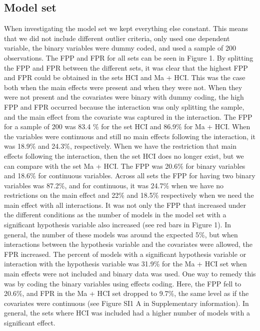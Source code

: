 \subsection{Model set}
When investigating the model set we kept everything else constant. This means that we did not include different outlier criteria, only used one dependent variable, the binary variables were dummy coded, and used a sample of 200 observations. The FPP and FPR for all sets can be seen in Figure 1.
By splitting the FPP and FPR between the different sets, it was clear that the highest FPP and FPR could be obtained in the sets HCI and Ma + HCI. This was the case both when the main effects were present and when they were not. When they were not present and the covariates were binary with dummy coding, the high FPP and FPR occurred because the interaction was only splitting the sample, and the main effect from the covariate was captured in the interaction. The FPP for a sample of 200 was 83.4 \% for the set HCI and 86.9\% for Ma + HCI. When the variables were continuous and still no main effects following the interaction, it was 18.9\% and 24.3\%, respectively. When we have the restriction that main effects following the interaction, then the set HCI does no longer exist, but we can compare with the set Ma + HCI. The FPP was 20.6\% for binary variables and 18.6\% for continuous variables. Across all sets the FPP for having two binary variables was 87.2\%, and for continuous, it was 24.7\% when we have no restrictions on the main effect and 22\% and 18.5\% respectively when we need the main effect with all interactions. 
It was not only the FPP that increased under the different conditions as the number of models in the model set with a significant hypothesis variable also increased (see red bars in Figure 1). In general, the number of these models was around the expected 5\%, but when interactions between the hypothesis variable and the covariates were allowed, the FPR increased. The percent of models with a significant hypothesis variable or interaction with the hypothesis variable was 31.9\% for the Ma + HCI set when main effects were not included and binary data was used. One way to remedy this was by coding the binary variables using effects coding. Here, the FPP fell to 20.6\%, and FPR in the Ma + HCI set dropped to 9.7\%, the same level as if the covariates were continuous (see Figure SI1 A in Supplementary information). In general, the sets where HCI was included had a higher number of models with a significant effect. 
